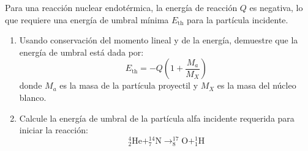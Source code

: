 \item Para una reacción nuclear endotérmica, la energía de reacción $Q$ es negativa, lo que requiere una energía de umbral mínima $E_{\text{th}}$ para la partícula incidente.
\begin{enumerate}
    \item Usando conservación del momento lineal y de la energía, demuestre que la energía de umbral está dada por:
    $$ E_{\text{th}} = -Q \left( 1 + \frac{M_a}{M_X} \right) $$
    donde $M_a$ es la masa de la partícula proyectil y $M_X$ es la masa del núcleo blanco.
    \item Calcule la energía de umbral de la partícula alfa incidente requerida para iniciar la reacción:
    $$ ^{4}_{2}\text{He} + ^{14}_{7}\text{N} \to ^{17}_{8}\text{O} + ^{1}_{1}\text{H} $$
\end{enumerate}